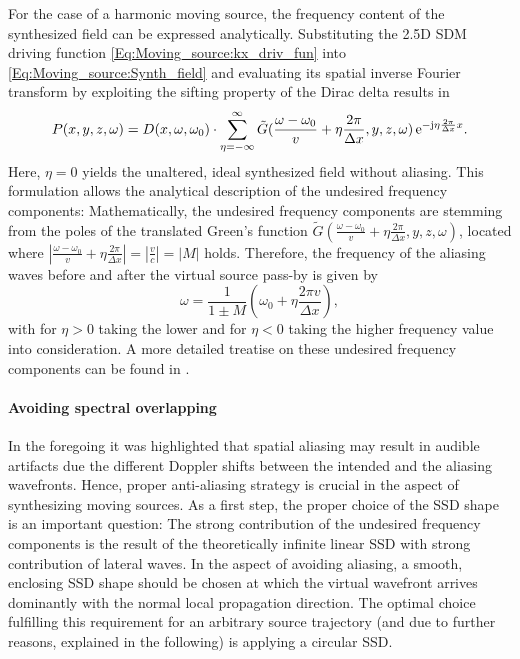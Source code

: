 For the case of a harmonic moving source, the frequency content of the synthesized field can be expressed analytically.
Substituting the 2.5D SDM driving function \eqref{Eq:Moving_source:kx_driv_fun} into \eqref{Eq:Moving_source:Synth_field} and evaluating its spatial inverse Fourier transform by exploiting the sifting property of the Dirac delta results in
\begin{equation}
P(x,y,z,\omega) = 
D(x,\omega,\omega_0) \cdot
\sum_{\eta = -\infty}^{\infty}
\tilde{G}( \frac{\omega-\omega_0}{v} +  \eta \frac{2\pi}{\Delta x},y,z, \omega )
\, \mathrm{e}^{-\mathrm{j}  \eta \frac{2\pi}{\Delta x}  x}.
\end{equation}
Here, $\eta = 0$ yields the unaltered, ideal synthesized field without aliasing.
This formulation allows the analytical description of the undesired frequency components: 
Mathematically, the undesired frequency components are stemming from the poles of the translated Green's function $\tilde{G}( \frac{\omega-\omega_0}{v} +  \eta \frac{2\pi}{\Delta x},y,z, \omega )$, located where $|\frac{\omega-\omega_0}{v} +  \eta \frac{2\pi}{\Delta x}| = |\frac{v}{c}| = |M|$ holds.
Therefore, the frequency of the aliasing waves before and after the virtual source pass-by is given by
\begin{equation}
\omega = \frac{1}{1 \pm M} \left( \omega_0 + \eta \frac{2\pi v}{\Delta x} \right),
\end{equation}
with for $\eta > 0$ taking the lower and for $\eta < 0$ taking the higher frequency value into consideration.
A more detailed treatise on these undesired frequency components can be found in \cite{firtha2016:daga}.

\paragraph{Avoiding spectral overlapping}
In the foregoing it was highlighted that spatial aliasing may result in audible artifacts due the different Doppler shifts between the intended and the aliasing wavefronts.
Hence, proper anti-aliasing strategy is crucial in the aspect of synthesizing moving sources.
As a first step, the proper choice of the SSD shape is an important question: 
The strong contribution of the undesired frequency components is the result of the theoretically infinite linear SSD with strong contribution of lateral waves.
In the aspect of avoiding aliasing, a smooth, enclosing SSD shape should be chosen at which the virtual wavefront arrives dominantly with the normal local propagation direction.
The optimal choice fulfilling this requirement for an arbitrary source trajectory (and due to further reasons, explained in the following) is applying a circular SSD.

